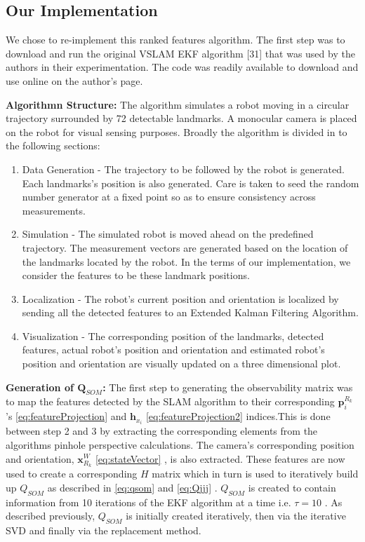 \documentclass[10pt,twocolumn,letterpaper]{article}
\begin{document}
\subsection{Our Implementation}
We chose to re-implement this ranked features algorithm. The first step was to download and run the original VSLAM EKF algorithm [31] that was used by the authors in their experimentation. The code was readily available to download and use online on the author's page.

\textbf{Algorithmn Structure:} The algorithm simulates a robot moving in a circular trajectory surrounded by 72 detectable landmarks. A monocular camera is placed on the robot for visual sensing purposes. Broadly the algorithm is divided in to the following sections:
\begin{enumerate}
  \item Data Generation - The trajectory to be followed by the robot is generated. Each landmarks's position is also generated. Care is taken to seed the random number generator at a fixed point so as to ensure consistency across measurements.
  \item Simulation - The simulated robot is moved ahead on the predefined trajectory. The measurement vectors are generated based on the location of the landmarks located by the robot. In the terms of our implementation, we consider the features to be these landmark positions. 
 \item Localization - The robot's current position and orientation is localized by sending all the detected features to an Extended Kalman Filtering Algorithm.
\item Visualization - The corresponding position of the landmarks, detected features, actual robot's position and orientation and estimated robot's position and orientation are visually updated on a three dimensional plot.
\end{enumerate}

\textbf{Generation of $\boldsymbol{Q}_{SOM}$:} The first step to generating the observability matrix was to map the features detected by the SLAM algorithm to their corresponding $\boldsymbol{p}_{i}^{R_k}$'s \eqref{eq:featureProjection} and $\boldsymbol{h}_{x_i}$ \eqref{eq:featureProjection2} indices.This is done between step 2 and 3 by extracting the corresponding elements from the algorithms pinhole perspective calculations. The camera's corresponding position and orientation, $\boldsymbol{x}_{R_k}^W$ \eqref{eq:stateVector} , is also extracted. These features are now used to create a corresponding $H$ matrix which in turn is used to iteratively build up $Q_{SOM}$ as described in \eqref{eq:qsom} and \eqref{eq:Qjjj} . $Q_{SOM}$ is created to contain information from 10 iterations of the EKF algorithm at a time i.e. $\tau = 10$ . As described previously, $Q_{SOM}$ is initially created iteratively, then via the iterative SVD and finally via the replacement method.
  
\end{document}

